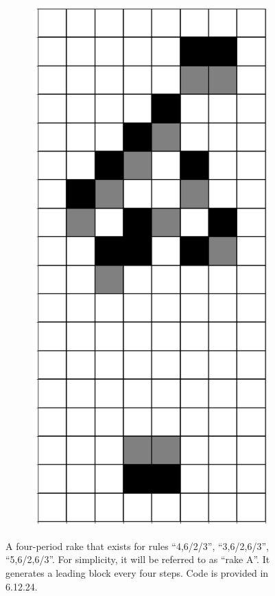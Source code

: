 \documentclass[12pt]{article}
\numberwithin{figure}{section} %
\begin{document}
\begin{figure}[H]
\begin{subfigure}{0.19\textwidth}
     \subcaption{}
   \end{subfigure}
           \begin{subfigure}{0.19\textwidth}
     \centering
     \includegraphics[width=\linewidth]{Section4/27.4}
     \subcaption{}
   \end{subfigure}
   \setcounter{subfigure}{0}
\caption{A four-period rake that exists for rules “4,6/2/3”, “3,6/2,6/3”, “5,6/2,6/3”. For simplicity, it will be referred to as “rake A”. It generates a leading block every four steps. Code is provided in 6.12.24. }
   \vspace{-1.5em}
\end{figure}
\end{document}
